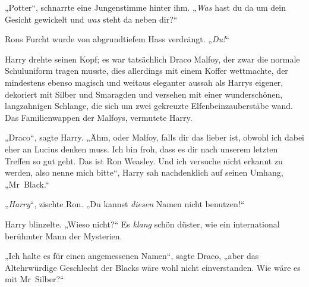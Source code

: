 „Potter“, schnarrte eine Jungenstimme hinter ihm.
„\emph{Was} hast du da um dein Gesicht gewickelt und \emph{was} steht da neben dir?“

Rons Furcht wurde von abgrundtiefem Hass verdrängt.
„\emph{Du!}“

Harry drehte seinen Kopf; es war tatsächlich Draco Malfoy, der zwar die normale Schuluniform tragen musste, dies allerdings mit einem Koffer wettmachte, der mindestens ebenso magisch und weitaus eleganter aussah als Harrys eigener, dekoriert mit Silber und Smaragden und versehen mit einer wunderschönen, langzahnigen Schlange, die sich um zwei gekreuzte Elfenbeinzauberstäbe wand. Das Familienwappen der Malfoys, vermutete Harry.

„Draco“, sagte Harry. „Ähm, oder Malfoy, falls dir das lieber ist, obwohl ich dabei eher an Lucius denken muss. Ich bin froh, dass es dir nach unserem letzten Treffen so gut geht. Das ist Ron Weasley. Und ich versuche nicht erkannt zu werden, also nenne mich bitte“, Harry sah nachdenklich auf seinen Umhang,
„Mr~Black.“

„\emph{Harry}“, zischte Ron.
„Du kannst \emph{diesen} Namen nicht benutzen!“

Harry blinzelte.
„Wieso nicht?“ Es \emph{klang} schön düster, wie ein international berühmter Mann der Mysterien.

„Ich halte es für einen angemessenen Namen“, sagte Draco, „aber das Altehrwürdige Geschlecht der Blacks wäre wohl nicht einverstanden. Wie wäre es mit Mr~Silber?“

